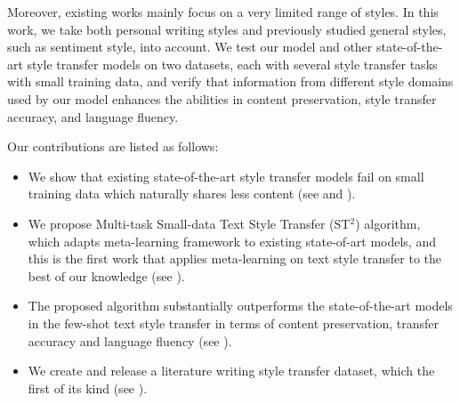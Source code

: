Moreover, existing works mainly focus on a very limited range of styles. In this work, we take both personal writing styles and previously studied general styles, such as sentiment style, into account. We test our model and other state-of-the-art style transfer models on two datasets, each with several style transfer tasks with small training data, and verify that information from different style domains used by our model enhances the abilities in content preservation, style transfer accuracy, and language fluency.

Our contributions are listed as follows:
\begin{itemize}
	\item We show that existing state-of-the-art style transfer models fail on small training data which naturally shares less content (see  and ).
	\item We propose Multi-task Small-data Text Style Transfer (ST$^2$) algorithm, which adapts meta-learning framework to existing state-of-art models, and this is the first work that applies meta-learning on text style transfer to the best of our knowledge (see ).
	\item The proposed algorithm substantially outperforms the state-of-the-art models in the few-shot text style transfer in terms of content preservation, transfer accuracy and language fluency (see ).
	\item We create and release a literature writing style transfer dataset, which the first of its kind (see ).%
\end{itemize}



